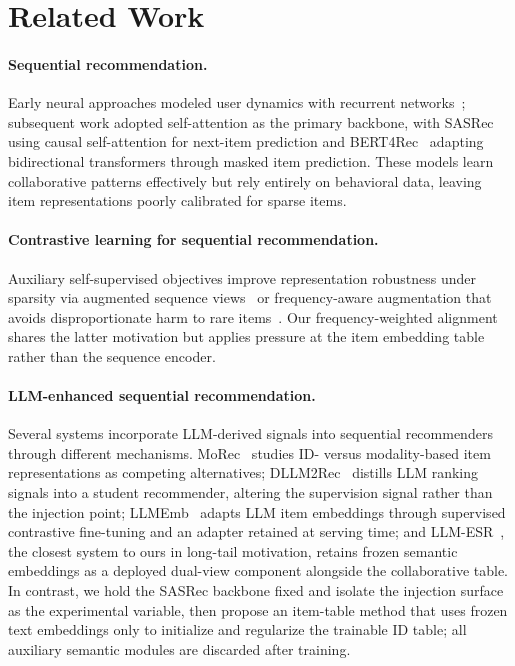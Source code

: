 \documentclass{article}
\begin{document}
\section{Related Work}

\paragraph{Sequential recommendation.}
Early neural approaches modeled user dynamics with recurrent
networks~\cite{hidasi2016gru4rec}; subsequent work adopted self-attention
as the primary backbone, with SASRec~\cite{kang2018sasrec} using causal
self-attention for next-item prediction and
BERT4Rec~\cite{sun2019bert4rec} adapting bidirectional transformers
through masked item prediction. These models learn collaborative
patterns effectively but rely entirely on behavioral data, leaving item
representations poorly calibrated for sparse items.

\paragraph{Contrastive learning for sequential recommendation.}
Auxiliary self-supervised objectives improve representation robustness
under sparsity via augmented sequence views~\cite{xie2022cl4srec, qiu2022duorec} or frequency-aware
augmentation that avoids disproportionate harm to rare items~\cite{facl}.
Our frequency-weighted alignment shares the latter motivation but
applies pressure at the item embedding table rather than the sequence encoder.

\paragraph{LLM-enhanced sequential recommendation.}
Several systems incorporate LLM-derived signals into sequential
recommenders through different mechanisms.
MoRec~\cite{morec} studies ID- versus modality-based item
representations as competing alternatives;
DLLM2Rec~\cite{dllm2rec} distills LLM ranking signals into a student
recommender, altering the supervision signal rather than the injection
point; LLMEmb~\cite{llmemb} adapts LLM item embeddings through
supervised contrastive fine-tuning and an adapter retained at serving
time; and LLM-ESR~\cite{llmesr}, the closest system to ours in
long-tail motivation, retains frozen semantic embeddings as a deployed
dual-view component alongside the collaborative table. In contrast,
we hold the SASRec backbone fixed and isolate the injection surface as
the experimental variable, then propose an item-table method that
uses frozen text embeddings only to initialize and regularize the
trainable ID table; all auxiliary semantic modules are discarded after training.
\end{document}
